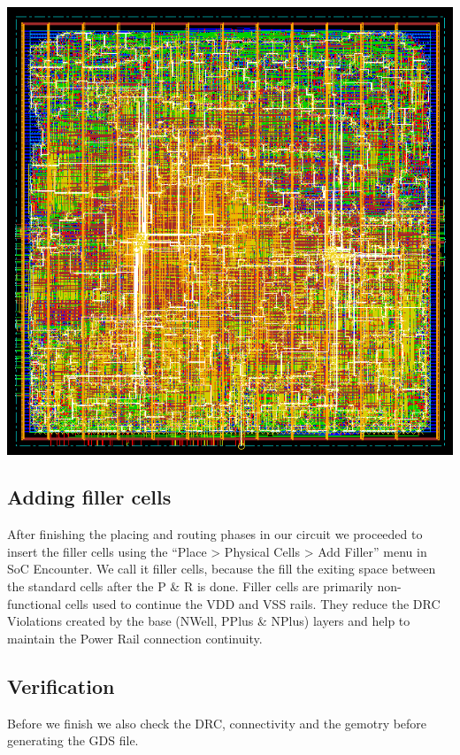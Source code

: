 \documentclass[12pt]{article}
\begin{document}
\begin{center}
\includegraphics[scale=0.4]{pic/true/route_final.png}
\end{center}

\subsection{Adding filler cells}
After finishing the placing and routing phases in our circuit we proceeded to insert the filler cells using the “Place > Physical Cells > Add Filler” menu in SoC Encounter. We call it filler cells, because the fill the exiting space between the standard cells after the P \& R is done. Filler cells are primarily non-functional cells used to continue the VDD and VSS rails. They reduce the DRC Violations created by the base (NWell, PPlus \& NPlus) layers and help to maintain the Power Rail connection continuity.
\subsection{Verification}
Before we finish we also check the DRC, connectivity and the gemotry before generating the GDS file.
\end{document}
